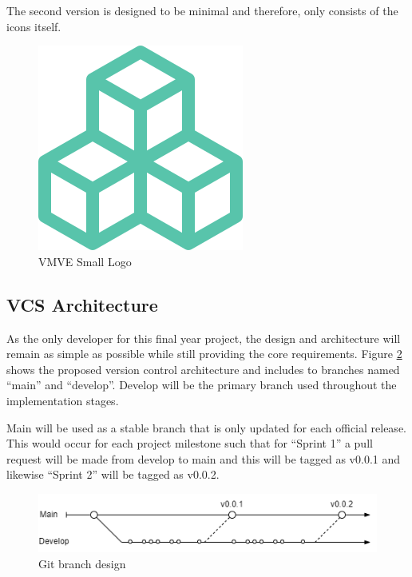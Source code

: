 \documentclass[11pt]{article}
\begin{document}
The second version is designed to be minimal and therefore, only consists of the
icons itself.

\begin{figure}[h!]
  \centering
  \includegraphics{images/project_icon.png}
  \caption{VMVE Small Logo}
  \label{fig:project_logo_small}
\end{figure}


\subsection{VCS Architecture}

As the only developer for this final year project, the design and architecture
will remain as simple as possible while still providing the core requirements.
Figure \ref{fig:brancharch} shows the proposed version control architecture and
includes to branches named ``main'' and ``develop''. Develop will be the primary
branch used throughout the implementation stages. 

Main will be used as a stable branch that is only updated for each official release.
This would occur for each project milestone such that for ``Sprint 1'' a pull request
will be made from develop to main and this will be tagged as v0.0.1 and likewise 
``Sprint 2'' will be tagged as v0.0.2.

\begin{figure}[h!]
  \centering
  \includegraphics[width=\textwidth]{images/current_branch_design.png}
  \caption{Git branch design}
  \label{fig:brancharch}
\end{figure}
\end{document}
